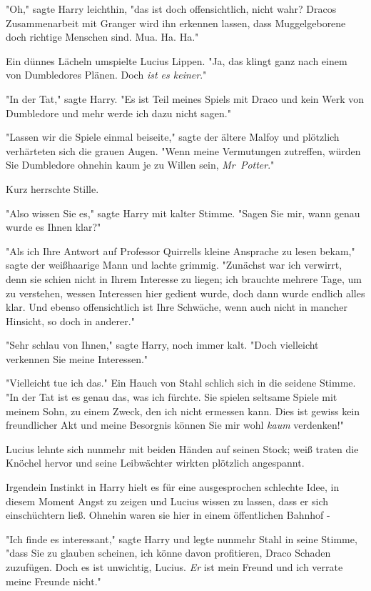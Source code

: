 {"Oh," sagte Harry leichthin, "das ist doch offensichtlich, nicht wahr? Dracos Zusammenarbeit mit Granger wird ihn erkennen lassen, dass Muggelgeborene doch richtige Menschen sind. Mua. Ha. Ha."

Ein dünnes Lächeln umspielte Lucius Lippen. "Ja, das klingt ganz nach einem von Dumbledores Plänen. Doch \emph{ist es keiner}."

"In der Tat," sagte Harry. "Es ist Teil meines Spiels mit Draco und kein Werk von Dumbledore und mehr werde ich dazu nicht sagen."

"Lassen wir die Spiele einmal beiseite," sagte der ältere Malfoy und plötzlich verhärteten sich die grauen Augen. "Wenn meine Vermutungen zutreffen, würden Sie Dumbledore ohnehin kaum je zu Willen sein, \emph{Mr~Potter}."

Kurz herrschte Stille.

"Also wissen Sie es," sagte Harry mit kalter Stimme. "Sagen Sie mir, wann genau wurde es Ihnen klar?"

"Als ich Ihre Antwort auf Professor Quirrells kleine Ansprache zu lesen bekam," sagte der weißhaarige Mann und lachte grimmig. "Zunächst war ich verwirrt, denn sie schien nicht in Ihrem Interesse zu liegen; ich brauchte mehrere Tage, um zu verstehen, wessen Interessen hier gedient wurde, doch dann wurde endlich alles klar. Und ebenso offensichtlich ist Ihre Schwäche, wenn auch nicht in mancher Hinsicht, so doch in anderer."

"Sehr schlau von Ihnen," sagte Harry, noch immer kalt. "Doch vielleicht verkennen Sie meine Interessen."

"Vielleicht tue ich das." Ein Hauch von Stahl schlich sich in die seidene Stimme. "In der Tat ist es genau das, was ich fürchte. Sie spielen seltsame Spiele mit meinem Sohn, zu einem Zweck, den ich nicht ermessen kann. Dies ist gewiss kein freundlicher Akt und meine Besorgnis können Sie mir wohl \emph{kaum} verdenken!"

Lucius lehnte sich nunmehr mit beiden Händen auf seinen Stock; weiß traten die Knöchel hervor und seine Leibwächter wirkten plötzlich angespannt.

Irgendein Instinkt in Harry hielt es für eine ausgesprochen schlechte Idee, in diesem Moment Angst zu zeigen und Lucius wissen zu lassen, dass er sich einschüchtern ließ. Ohnehin waren sie hier in einem öffentlichen Bahnhof -

"Ich finde es interessant," sagte Harry und legte nunmehr Stahl in seine Stimme, "dass Sie zu glauben scheinen, ich könne davon profitieren, Draco Schaden zuzufügen. Doch es ist unwichtig, Lucius. \emph{Er} ist mein Freund und ich verrate meine Freunde nicht."

}
